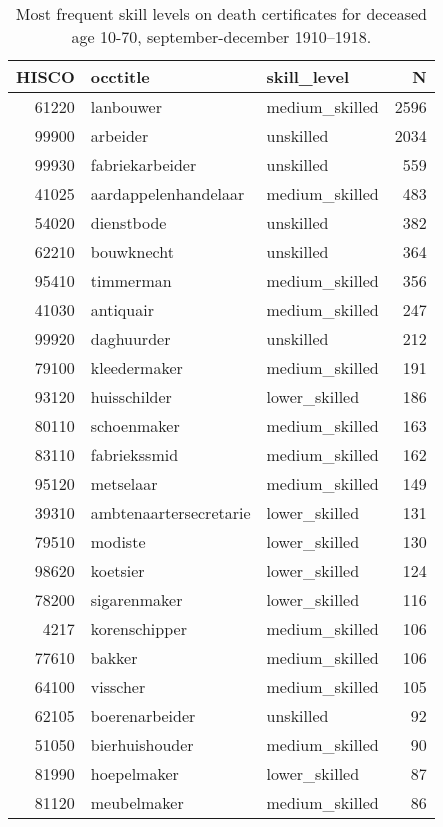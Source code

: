 \begin{table}

\caption{\label{tab:tab:topskill}Most frequent skill levels on death certificates for deceased age 10-70, september-december 1910–1918.}
\centering
\begin{tabular}[t]{r|l|l|r}
\hline
HISCO & occtitle & skill\_level & N\\
\hline
61220 & lanbouwer & medium\_skilled & 2596\\
\hline
99900 & arbeider & unskilled & 2034\\
\hline
99930 & fabriekarbeider & unskilled & 559\\
\hline
41025 & aardappelenhandelaar & medium\_skilled & 483\\
\hline
54020 & dienstbode & unskilled & 382\\
\hline
62210 & bouwknecht & unskilled & 364\\
\hline
95410 & timmerman & medium\_skilled & 356\\
\hline
41030 & antiquair & medium\_skilled & 247\\
\hline
99920 & daghuurder & unskilled & 212\\
\hline
79100 & kleedermaker & medium\_skilled & 191\\
\hline
93120 & huisschilder & lower\_skilled & 186\\
\hline
80110 & schoenmaker & medium\_skilled & 163\\
\hline
83110 & fabriekssmid & medium\_skilled & 162\\
\hline
95120 & metselaar & medium\_skilled & 149\\
\hline
39310 & ambtenaartersecretarie & lower\_skilled & 131\\
\hline
79510 & modiste & lower\_skilled & 130\\
\hline
98620 & koetsier & lower\_skilled & 124\\
\hline
78200 & sigarenmaker & lower\_skilled & 116\\
\hline
4217 & korenschipper & medium\_skilled & 106\\
\hline
77610 & bakker & medium\_skilled & 106\\
\hline
64100 & visscher & medium\_skilled & 105\\
\hline
62105 & boerenarbeider & unskilled & 92\\
\hline
51050 & bierhuishouder & medium\_skilled & 90\\
\hline
81990 & hoepelmaker & lower\_skilled & 87\\
\hline
81120 & meubelmaker & medium\_skilled & 86\\

\end{tabular}
\end{table}
